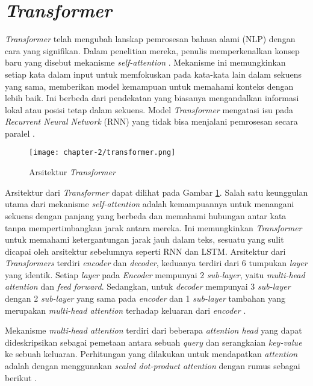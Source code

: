 \section{\textit{Transformer}}
\label{sec:transformer}

\textit{Transformer} telah mengubah lanskap pemrosesan bahasa alami (NLP) dengan cara yang signifikan. Dalam penelitian mereka, penulis memperkenalkan konsep baru yang disebut mekanisme \textit{self-attention} \parencite{transformers}. Mekanisme ini memungkinkan setiap kata dalam input untuk memfokuskan pada kata-kata lain dalam sekuens yang sama, memberikan model kemampuan untuk memahami konteks dengan lebih baik. Ini berbeda dari pendekatan yang biasanya mengandalkan informasi lokal atau posisi tetap dalam sekuens. Model \textit{Transformer} mengatasi isu pada \textit{Recurrent Neural Network} (RNN) yang tidak bisa menjalani pemrosesan secara paralel \parencite{transformers}.

\begin{figure}[ht]
    \vspace{0.25cm}
    \centering
    \texttt{[image: chapter-2/transformer.png]}
    \caption{Arsitektur \textit{Transformer} \parencite{transformers}}
    \label{fig:transformer}
\end{figure}

Arsitektur dari \textit{Transformer} dapat dilihat pada Gambar \ref{fig:transformer}. Salah satu keunggulan utama dari mekanisme \textit{self-attention} adalah kemampuannya untuk menangani sekuens dengan panjang yang berbeda dan memahami hubungan antar kata tanpa mempertimbangkan jarak antara mereka. Ini memungkinkan \textit{Transformer} untuk memahami ketergantungan jarak jauh dalam teks, sesuatu yang sulit dicapai oleh arsitektur sebelumnya seperti RNN dan LSTM. Arsitektur dari \textit{Transformers} terdiri \textit{encoder} dan \textit{decoder}, keduanya terdiri dari 6 tumpukan \textit{layer} yang identik. Setiap \textit{layer} pada \textit{Encoder} mempunyai 2 \textit{sub-layer}, yaitu \textit{multi-head attention} dan \textit{feed forward}. Sedangkan, untuk \textit{decoder} mempunyai 3 \textit{sub-layer} dengan 2 \textit{sub-layer} yang sama pada \textit{encoder} dan 1 \textit{sub-layer} tambahan yang merupakan \textit{multi-head attention} terhadap keluaran dari \textit{encoder} \parencite{transformers}.

Mekanisme \textit{multi-head attention} terdiri dari beberapa \textit{attention head} yang dapat dideskripsikan sebagai pemetaan antara sebuah \textit{query} dan serangkaian \textit{key-value} ke sebuah keluaran. Perhitungan yang dilakukan untuk mendapatkan \textit{attention} adalah dengan menggunakan \textit{scaled dot-product attention} dengan rumus sebagai berikut \parencite{transformers}.

